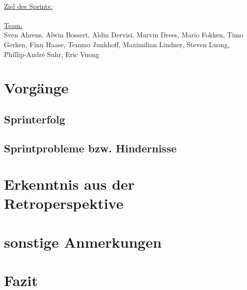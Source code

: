 \documentclass[12pt,a4paper, oneside]{article}
\begin{document}
    \noindent
    \\
    \underline{Ziel des Sprints:}
    \\

    \noindent
    \\
    \underline {Team:}
    \\
    Sven Ahrens, Alwin Bossert, Aldin Dervisi, Marvin Drees, Mario Fokken,
    Timo Gerken, Finn Haase, Temmo Junkhoff, Maximilian Lindner, Steven Luong,
    Phillip-André Suhr, Eric Vuong


    \section{Vorgänge}

    \subsection{Sprinterfolg}

    \subsection{Sprintprobleme bzw. Hindernisse}


    \section{Erkenntnis aus der Retroperspektive}


    \section{sonstige Anmerkungen}


    \section{Fazit}
\end{document}
